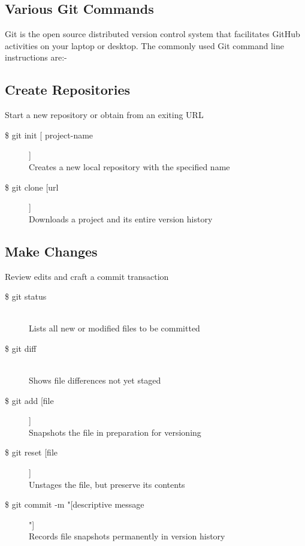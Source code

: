 \subsection{Various Git Commands}

Git is the open source distributed version control system that facilitates GitHub activities on your laptop or desktop. The commonly used Git command line instructions are:-\\

\subsection*{Create Repositories}
Start a new repository or obtain from an exiting URL

\begin{description}

\item [\$ git init [ project-name]]\\
Creates a new local repository with the specified name
\item [\$ git clone [url]]\\
Downloads a project and its entire version history

\end{description}


\subsection*{Make Changes}
Review edits and craft a commit transaction

\begin{description}

\item [\$ git status] \leavevmode \\
Lists all new or modified files to be committed

\item [\$ git diff] \leavevmode \\
Shows file differences not yet staged

\item [\$ git add [file]]\\
Snapshots the file in preparation for versioning

\item [\$ git reset [file]]\\
Unstages the file, but preserve its contents

\item [\$ git commit -m "[descriptive message]"]\\
Records file snapshots permanently in version history

\end{description}

